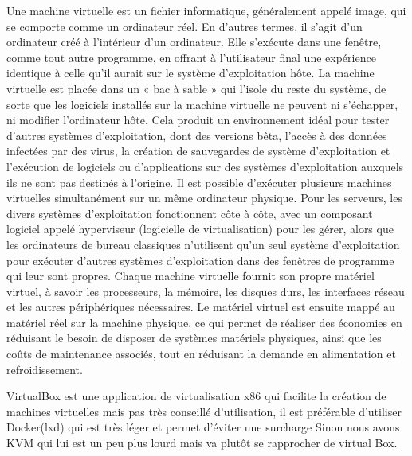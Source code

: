 Une machine virtuelle est un fichier informatique, généralement appelé image, qui se comporte comme un ordinateur réel.
En d’autres termes, il s’agit d’un ordinateur créé à l’intérieur d’un ordinateur. Elle s’exécute dans une fenêtre,
 comme tout autre programme, en offrant à l’utilisateur final une expérience identique à celle qu’il aurait sur le
 système d’exploitation hôte. La machine virtuelle est placée dans un « bac à sable » qui l’isole du reste du système,
 de sorte que les logiciels installés sur la machine virtuelle ne peuvent ni s’échapper, ni modifier l’ordinateur hôte.
 Cela produit un environnement idéal pour tester d’autres systèmes d’exploitation, dont des versions bêta,
 l’accès à des données infectées par des virus, la création de sauvegardes de système d’exploitation et l’exécution
 de logiciels ou d’applications sur des systèmes d’exploitation auxquels ils ne sont pas destinés à l’origine.
Il est possible d’exécuter plusieurs machines virtuelles simultanément sur un même ordinateur physique.
Pour les serveurs, les divers systèmes d’exploitation fonctionnent côte à côte, avec un composant logiciel appelé hyperviseur
(logicielle de virtualisation) pour les gérer, alors que les ordinateurs de bureau classiques n’utilisent qu’un seul
système d’exploitation pour exécuter d’autres systèmes d’exploitation dans des fenêtres de programme qui leur sont propres.
 Chaque machine virtuelle fournit son propre matériel virtuel, à savoir les processeurs, la mémoire, les disques durs,
  les interfaces réseau et les autres périphériques nécessaires. Le matériel virtuel est ensuite mappé au matériel réel
   sur la machine physique, ce qui permet de réaliser des économies en réduisant le besoin de disposer de systèmes matériels physiques,
    ainsi que les coûts de maintenance associés, tout en réduisant la demande en alimentation et refroidissement.


VirtualBox est une application de virtualisation x86 qui facilite la création de machines virtuelles mais pas très conseillé
d’utilisation, il est préférable d'utiliser Docker(lxd) qui est très léger et permet d'éviter une surcharge
Sinon nous avons KVM qui lui est un peu plus lourd mais va plutôt se rapprocher de virtual Box.

